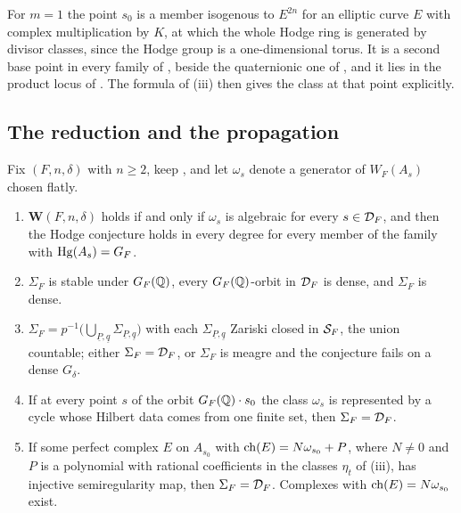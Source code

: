 \begin{remark}\label{rem:cmquadratic}
For $m=1$ the point $s_{0}$ is a member isogenous to $E^{2n}$ for an elliptic
curve $E$ with complex multiplication by $K$, at which the whole Hodge ring
is generated by divisor classes, since the Hodge group is a one-dimensional
torus. It is a second base point in every family of ,
beside the quaternionic one of , and it lies in the
product locus of . The formula of
(iii) then gives the class at that point explicitly.
\end{remark}

\subsection{The reduction and the propagation}\label{ssec:cmpropagation}

\begin{theorem}
\label{thm:cmpropagation}
Fix $(F,n,\delta)$ with $n\ge2$, keep , and let
$\omega_{s}$ denote a generator of $W_{F}(A_{s})$ chosen flatly.
\begin{enumerate}[label=\textup{(\roman*)},leftmargin=2.6em,itemsep=2pt]
\item $\mathbf{W}(F,n,\delta)$ holds if and only if $\omega_{s}$ is algebraic
  for every $s\in\mathcal{D}_{F}$, and then the Hodge conjecture holds in every
  degree for every member of the family with $\operatorname{Hg}(A_{s})=G_{F}$.
\item $\Sigma_{F}$ is stable under $G_{F}(\mathbb{Q})$, every $G_{F}(\mathbb{Q})$-orbit in
  $\mathcal{D}_{F}$ is dense, and $\Sigma_{F}$ is dense.
\item $\Sigma_{F}=p^{-1}\bigl(\bigcup_{\underline{P},\underline{q}}
  \Sigma_{\underline{P},\underline{q}}\bigr)$ with each
  $\Sigma_{\underline{P},\underline{q}}$ Zariski closed in $\mathcal{S}_{F}$, the
  union countable; either $\Sigma_{F}=\mathcal{D}_{F}$, or $\Sigma_{F}$ is meagre and
  the conjecture fails on a dense $G_{\delta}$.
\item If at every point $s$ of the orbit $G_{F}(\mathbb{Q})\cdot s_{0}$ the class
  $\omega_{s}$ is represented by a cycle whose Hilbert data comes from one
  finite set, then $\Sigma_{F}=\mathcal{D}_{F}$.
\item If some perfect complex $E$ on $A_{s_{0}}$ with
  $\operatorname{ch}(E)=N\omega_{s_{0}}+P$, where $N\ne0$ and $P$ is a polynomial with
  rational coefficients in the classes $\eta_{t}$ of
  (iii), has injective semiregularity map, then
  $\Sigma_{F}=\mathcal{D}_{F}$. Complexes with $\operatorname{ch}(E)=N\omega_{s_{0}}$ exist.
\end{enumerate}
\end{theorem}

